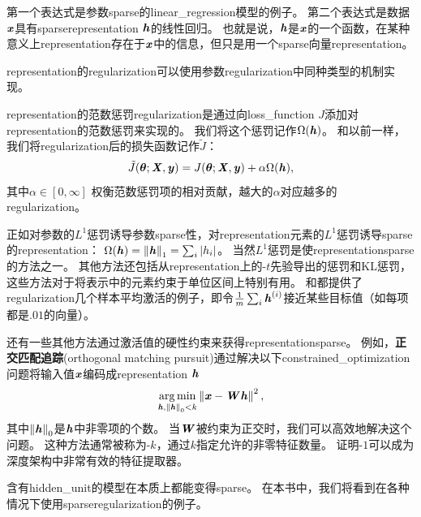 
第一个表达式是参数\gls{sparse}的\gls{linear_regression}模型的例子。
第二个表达式是数据$\boldsymbol{\mathit{x}}$具有\gls{sparse}\gls{representation} $\boldsymbol{\mathit{h}}$的线性回归。
也就是说，$\boldsymbol{\mathit{h}}$是$\boldsymbol{\mathit{x}}$的一个函数，在某种意义上\gls{representation}存在于$\boldsymbol{\mathit{x}}$中的信息，但只是用一个\gls{sparse}向量\gls{representation}。

\gls{representation}的\gls{regularization}可以使用参数\gls{regularization}中同种类型的机制实现。

\gls{representation}的范数惩罚\gls{regularization}是通过向\gls{loss_function} $J$添加对\gls{representation}的范数惩罚来实现的。
我们将这个惩罚记作$\Omega(\boldsymbol{\mathit{h}})$。
和以前一样，我们将\gls{regularization}后的损失函数记作$\tilde J$：
\begin{align}
 \tilde J(\boldsymbol{\theta}; \boldsymbol{\mathit{X}}, \boldsymbol{\mathit{y}}) =  J(\boldsymbol{\theta}; \boldsymbol{\mathit{X}}, \boldsymbol{\mathit{y}})  + \alpha \Omega(\boldsymbol{\mathit{h}}),
\end{align}
其中$\alpha \in [0, \infty]$ 权衡范数惩罚项的相对贡献，越大的$\alpha$对应越多的\gls{regularization}。

正如对参数的$L^1$惩罚诱导参数\gls{sparse}性，对\gls{representation}元素的$L^1$惩罚诱导\gls{sparse}的\gls{representation}：
$\Omega(\boldsymbol{\mathit{h}}) = \left\lVert\boldsymbol{\mathit{h}}\right\rVert_1 = \sum_i |h_i|$。
当然$L^1$惩罚是使\gls{representation}\gls{sparse}的方法之一。
其他方法还包括从\gls{representation}上的-$t$先验导出的惩罚\citep{Olshausen+Field-1996,Bergstra-Phd-2011}和\gls{KL}惩罚\citep{Larochelle+Bengio-2008}，这些方法对于将表示中的元素约束于单位区间上特别有用。
\cite{HonglakL2008-small}和\cite{Goodfellow2009}都提供了\gls{regularization}几个样本平均激活的例子，即令$\frac{1}{m}\sum_i \boldsymbol{\mathit{h}}^{(i)}$接近某些目标值（如每项都是$.01$的向量）。

还有一些其他方法通过激活值的硬性约束来获得\gls{representation}\gls{sparse}。
例如，\textbf{正交匹配追踪}(orthogonal matching pursuit)\citep{pati93orthogonal}通过解决以下\gls{constrained_optimization}问题将输入值$\boldsymbol{\mathit{x}}$编码成\gls{representation} $\boldsymbol{\mathit{h}}$
\begin{align}
 \underset{\boldsymbol{\mathit{h}}, \left\lVert\boldsymbol{\mathit{h}}\right\rVert_0 < k}{\arg\min} \left\lVert\boldsymbol{\mathit{x}} - \boldsymbol{\mathit{W}} \boldsymbol{\mathit{h}}\right\rVert^2,
\end{align}
其中$\left\lVert\boldsymbol{\mathit{h}}\right\rVert_0 $是$\boldsymbol{\mathit{h}}$中非零项的个数。
当$\boldsymbol{\mathit{W}}$被约束为正交时，我们可以高效地解决这个问题。
这种方法通常被称为-$k$，通过$k$指定允许的非零特征数量。
\cite{Coates2011b}证明-$1$可以成为深度架构中非常有效的特征提取器。


含有\gls{hidden_unit}的模型在本质上都能变得\gls{sparse}。
在本书中，我们将看到在各种情况下使用\gls{sparse}\gls{regularization}的例子。

